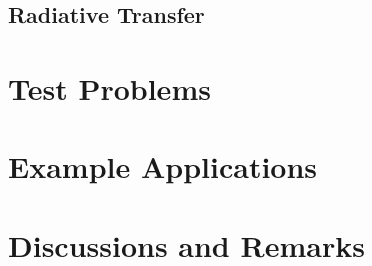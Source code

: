 \subsection{Radiative Transfer}
\label{sec:radiative-transfer}


\section{Test Problems}
\label{sec:test-problems}

\section{Example Applications}
\label{sec:example-applications}

\section{Discussions and Remarks}
\label{sec:discussions}


